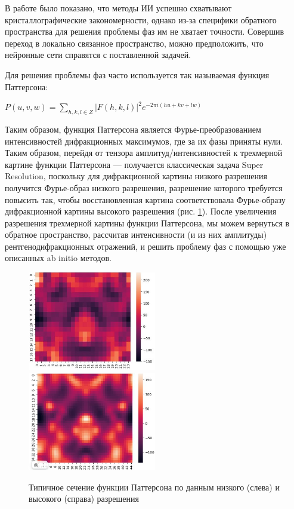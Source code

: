В работе было показано, что методы ИИ успешно схватывают кристаллографические закономерности, однако из-за специфики обратного пространства для решения проблемы фаз им не хватает точности. Совершив переход в локально связанное пространство, можно предположить, что нейронные сети справятся с поставленной задачей.

Для решения проблемы фаз часто используется так называемая функция Паттерсона:

\begin{center}
    $P(u, v, w) = \sum\limits_{h,k,l\in Z} |F(h,k,l)|^2e^{-2\pi i(hu+kv+lw)}$
\end{center}

Таким образом, функция Паттерсона является Фурье-преобразованием интенсивностей дифракционных максимумов, где за их фазы приняты нули. Таким образом, перейдя от тензора амплитуд/интенсивностей к трехмерной картине функции Паттерсона --- получается классическая задача Super Resolution, поскольку для дифракционной картины низкого разрешения получится Фурье-образ низкого разрешения, разрешение которого требуется повысить так, чтобы восстановленная картина соответствовала Фурье-образу дифракционной картины высокого разрешения (рис. \ref{patt}). После увеличения разрешения трехмерной картины функции Паттерсона, мы можем вернуться в обратное пространство, рассчитав интенсивности (и из них амплитуды) рентгенодифракционных отражений, и решить проблему фаз с помощью уже описанных ab initio методов.

\begin{figure}[H]
    \centering
    \includegraphics[width=0.5\textwidth]{figures/patt_high.png}\hfill
    \includegraphics[width=0.5\textwidth]{figures/patt_low.png}
    \caption{Типичное сечение функции Паттерсона по данным низкого (слева) и высокого (справа) разрешения}
    \label{patt}
\end{figure}